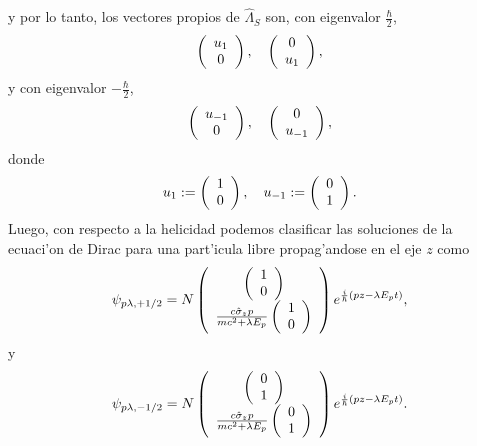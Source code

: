 y por lo tanto, los vectores propios de $\hat{\Lambda}_{S}$ son, con eigenvalor
$\frac{\hbar}{2}$,
\begin{equation}
\left(
\begin{array}
[c]{c}%
u_{1}\\
0
\end{array}
\right) ,\quad
\left(
\begin{array}
[c]{c}%
0\\
u_{1}%
\end{array}
\right),
\end{equation}
y con eigenvalor $-\frac{\hbar}{2}$,
\begin{equation}
\left(\begin{array}[c]{c}u_{-1}\\ 0 \end{array}\right) ,\quad
\left(\begin{array}[c]{c} 0\\u_{-1}\end{array}\right),
\end{equation}
donde
\begin{equation}
u_{1}:=\left(\begin{array}[c]{c} 1\\ 0 \end{array}\right) , \quad 
u_{-1}:=\left(\begin{array}[c]{c} 0\\ 1 \end{array}\right).
\end{equation}
Luego, con respecto a la helicidad podemos clasificar las soluciones de la
ecuaci'on de Dirac para una part'icula libre propag'andose en el eje $z$ como
\begin{equation}
\psi_{p\lambda,+1/2} 
=N\left(\begin{array}[c]{c}\left(\begin{array}[c]{c} 1\\ 0 \end{array}\right) \\
\frac{c\hat{\sigma}_{z}p}{mc^2+\lambda E_{p}}\left(
\begin{array}
[c]{c}%
1\\
0
\end{array}
\right)
\end{array}
\right) e^{\frac{i}{\hbar}\left( pz-\lambda E_{p}t\right) },
\end{equation}
y
\begin{equation}
\psi_{p\lambda,-1/2}=N\left(\begin{array}[c]{c}
\left(\begin{array}[c]{c}
0\\
1
\end{array}
\right) \\
\frac{c\hat{\sigma}_{z}p}{mc^2+\lambda E_{p}}\left(
\begin{array}
[c]{c}
0\\
1
\end{array}
\right)
\end{array}
\right) e^{\frac{i}{\hbar}\left( pz-\lambda E_{p}t\right) }.
\end{equation}
